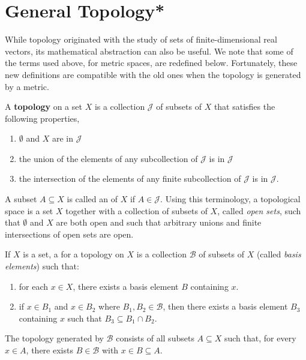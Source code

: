 \section{General Topology*}

While topology originated with the study of sets of finite-dimensional real vectors, its mathematical abstraction can also be useful.
We note that some of the terms used above, for metric spaces, are redefined below.
Fortunately, these new definitions are compatible with the old ones when the topology is generated by a metric.

\begin{definition}
A \textbf{topology} on a set $X$ is a collection $\mathcal{J}$ of subsets of $X$ that satisfies the following properties,
\begin{enumerate}
\item $\emptyset$ and $X$ are in $\mathcal{J}$
\item the union of the elements of any subcollection of $\mathcal{J}$ is in $\mathcal{J}$
\item the intersection of the elements of any finite subcollection of $\mathcal{J}$ is in $\mathcal{J}$.
\end{enumerate}
\end{definition}

A subset $A \subseteq X$ is called an  of $X$ if $A \in \mathcal{J}$.
Using this terminology, a topological space is a set $X$ together with a collection of subsets of $X$, called \emph{open sets}, such that $\emptyset$ and $X$ are both open and such that arbitrary unions and finite intersections of open sets are open.

\begin{definition}
\label{definition:topology_basis}
If $X$ is a set, a  for a topology on $X$ is a collection $\mathcal{B}$ of subsets of $X$ (called \emph{basis elements}) such that:
\begin{enumerate}
\item for each $x \in X$, there exists a basis element $B$ containing $x$.
\item if $x \in B_1$ and $x \in B_2$ where $B_1, B_2 \in \mathcal{B}$, then there exists a basis element $B_3$ containing $x$ such that $B_3 \subseteq B_1 \cap B_2$.
\end{enumerate}
The topology generated by $\mathcal B$ consists of all subsets $A\subseteq X$ such that, for every $x\in A$, there exists $B\in\mathcal B$ with $x\in B\subseteq A$.
\end{definition}

